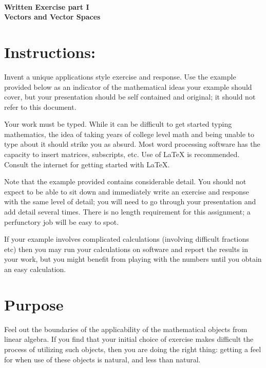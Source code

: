 \documentclass[12pt]{article}
\begin{document}
\thispagestyle{empty}
~
\vspace{-2cm}

\begin{center}
\vspace{-1.5cm}
{\Large{\bfseries  
Written Exercise part I\\
Vectors and Vector Spaces}
 }  \\[9mm]
\end{center}




\section{Instructions:} 
Invent a unique applications style exercise and response. 
Use the example provided below as an indicator of the mathematical ideas your example should cover, but your presentation should be self contained and original; it should not refer to this document. 

Your work must be typed. While it can be difficult to get started typing mathematics, the idea of taking years of college level math and being unable to type about it should strike you as absurd. Most word processing software has the capacity to insert matrices, subscripts, etc. Use of LaTeX is recommended. Consult the internet for getting started with LaTeX. 

Note that the example provided contains considerable detail. You should not expect to be able to sit down and immediately write an exercise and response with the same level of detail; you will need to go through your presentation and add detail several times. There is no length requirement for this assignment; a perfunctory job will be easy to spot. 

If your example involves complicated calculations (involving difficult fractions etc) then you may run your calculations on software and report the results in your work, but you might benefit from playing with the numbers until you obtain an easy calculation. 


\section{Purpose}

Feel out the boundaries of the applicability of the mathematical objects from linear algebra. If you find that your initial choice of exercise  makes difficult the process of utilizing such objects, then you are doing the right thing: getting a feel for when use of these objects is natural, and less than natural. 
\end{document}
